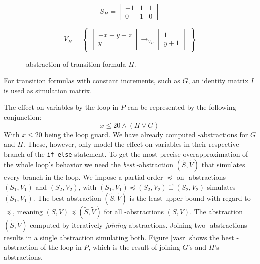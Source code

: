 \begin{figure}[H]
	\begin{center}
		\begin{minipage}{0.3\linewidth}
			\begin{equation*}
				S_H = \begin{bmatrix} -1 & 1 & 1 \\ 0 & 1 & 0 \end{bmatrix}
			\end{equation*}
		\end{minipage}
		\begin{minipage}{0.6\linewidth}
			\begin{equation*}
				V_H = \begin{Bmatrix} \begin{bmatrix} - x + y + z \\ y \end{bmatrix} \rightarrow_{V_H} \begin{bmatrix}	1 \\ y + 1 \end{bmatrix} \end{Bmatrix}
			\end{equation*}
		\end{minipage}
		\caption{\qvasr-abstraction of transition formula $H$.}
		\label{vasr H}
	\end{center}
\end{figure}
\vspace*{-2em}For transition formulas with constant increments, such as $G$, an identity matrix $I$ is used as simulation matrix. \par
The effect on variables by the loop in $P$ can be represented by the following conjunction: 
\begin{equation*}
	x \leq 20 \land (H \lor G)
\end{equation*}
With $x \leq 20$ being the loop guard. We have already computed \qvasr-abstractions for $G$ and $H$. These, however, only model the effect on variables in their respective branch of the \texttt{if else} statement. To get the most precise overapproximation of the whole loop's behavior we need the \textsl{best} \qvasr-abstraction $(\tilde{S}, \tilde{V})$ that simulates every branch in the loop.
We impose a partial order $\preceq$ on \qvasr-abstractions $(S_1, V_1)$ and $(S_2, V_2)$, with $(S_1, V_1) \preceq (S_2, V_2)$ if $(S_2, V_2)$ simulates $(S_1, V_1)$. The best abstraction $(\tilde{S}, \tilde{V})$ is the least upper bound with regard to $\preceq$, meaning $(S, V) \preceq (\tilde{S}, \tilde{V})$ for all \qvasr-abstractions $(S, V)$. The abstraction $(\tilde{S}, \tilde{V})$ computed by iteratively \textsl{joining} abstractions. Joining two \qvasr-abstractions results in a single abstraction simulating both. Figure \ref{vasr} shows the best \qvasr-abstraction of the loop in $P$, which is the result of joining $G$'s and $H$'s abstractions. \\
